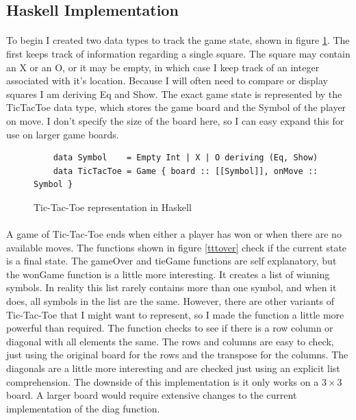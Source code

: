 \documentclass[10pt]{article}
\begin{document}
\subsection{Haskell Implementation}
    \paragraph{} To begin I created two data types to track the game state, shown in 
    figure \ref{hasktttgame}.  The first keeps track of information regarding a single
    square.  The square may contain an X or an O, or it may be empty, in which case I 
    keep track of an integer associated with it's location.  Because I will often
    need to compare or display squares I am deriving Eq and Show.  The exact game 
    state is represented by the TicTacToe data type, which stores the game board and
    the Symbol of the player on move.  I don't specify the size of the board here, so
    I can easy expand this for use on larger game boards.

    \begin{figure}[ht]
        \centering
        \begin{verbatim}
    data Symbol    = Empty Int | X | O deriving (Eq, Show)
    data TicTacToe = Game { board :: [[Symbol]], onMove :: Symbol }\end{verbatim}
        \caption{Tic-Tac-Toe representation in Haskell} \label{hasktttgame}
    \end{figure}

    \paragraph{} A game of Tic-Tac-Toe ends when either a player has won or when 
    there are no available moves.  The functions shown in figure \ref{tttover} check
    if the current state is a final state.  The gameOver and tieGame functions are
    self explanatory, but the wonGame function is a little more interesting.  It 
    creates a list of winning symbols.  In reality this list rarely contains more 
    than one symbol, and when it does, all symbols in the list are the same.  
    However, there are other variants of Tic-Tac-Toe that I might want to represent, 
    so I made the function a little more powerful than required.  The function checks
    to see if there is a row column or diagonal with all elements the same.  The rows
    and columns are easy to check, just using the original board for the rows and the
    transpose for the columns.  The diagonals are a little more interesting and are 
    checked just using an explicit list comprehension.  The downside of
    this implementation is it only works on a $3 \times 3$ board.  A larger board 
    would require extensive changes to the current implementation of the diag
    function.
\end{document}
